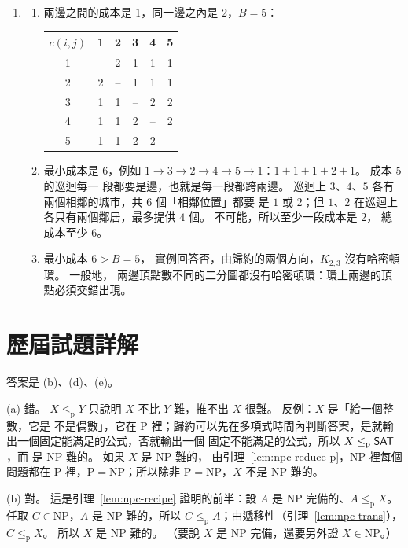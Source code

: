 \begin{enumerate}
\item
\begin{enumerate}
\item 兩邊之間的成本是 $1$，同一邊之內是 $2$，$B = 5$：
\begin{center}
\begin{tabular}{c|ccccc}
$c(i, j)$ & 1 & 2 & 3 & 4 & 5 \\
\hline
1 & -- & 2 & 1 & 1 & 1 \\
2 & 2 & -- & 1 & 1 & 1 \\
3 & 1 & 1 & -- & 2 & 2 \\
4 & 1 & 1 & 2 & -- & 2 \\
5 & 1 & 1 & 2 & 2 & -- \\
\end{tabular}
\end{center}
\item 最小成本是 $6$，例如 $1 \to 3 \to 2 \to 4 \to 5 \to 1$：$1 + 1 + 1 + 2 + 1$。 成本 $5$ 的巡迴每一
段都要是邊，也就是每一段都跨兩邊。 巡迴上 $3$、$4$、$5$ 各有兩個相鄰的城市，共 $6$ 個「相鄰位置」都要
是 $1$ 或 $2$；但 $1$、$2$ 在巡迴上各只有兩個鄰居，最多提供 $4$ 個。 不可能，所以至少一段成本是 $2$，
總成本至少 $6$。
\item 最小成本 $6 > B = 5$， 實例回答否，由歸約的兩個方向，$K_{2,3}$ 沒有哈密頓環。 一般地，
兩邊頂點數不同的二分圖都沒有哈密頓環：環上兩邊的頂點必須交錯出現。
\end{enumerate}
\end{enumerate}

\section*{歷屆試題詳解}

答案是 (b)、(d)、(e)。

(a) 錯。 $X \le_{\mathrm{p}} Y$ 只說明 $X$ 不比 $Y$ 難，推不出 $X$ 很難。 反例：$X$ 是「給一個整數，它是
不是偶數」，它在 P 裡；歸約可以先在多項式時間內判斷答案，是就輸出一個固定能滿足的公式，否就輸出一個
固定不能滿足的公式，所以 $X \le_{\mathrm{p}} \textsf{SAT}$，而  是 NP 難的。 如果 $X$ 是 NP 難的，
由引理~\ref{lem:npc-reduce-p}，NP 裡每個問題都在 P 裡，$\mathrm{P} = \mathrm{NP}$；所以除非
$\mathrm{P} = \mathrm{NP}$，$X$ 不是 NP 難的。

(b) 對。 這是引理~\ref{lem:npc-recipe} 證明的前半：設 $A$ 是 NP 完備的、$A \le_{\mathrm{p}} X$。 任取
$C \in \mathrm{NP}$，$A$ 是 NP 難的，所以 $C \le_{\mathrm{p}} A$；由遞移性（引理~\ref{lem:npc-trans}），
$C \le_{\mathrm{p}} X$。 所以 $X$ 是 NP 難的。 （要說 $X$ 是 NP 完備，還要另外證 $X \in \mathrm{NP}$。）

